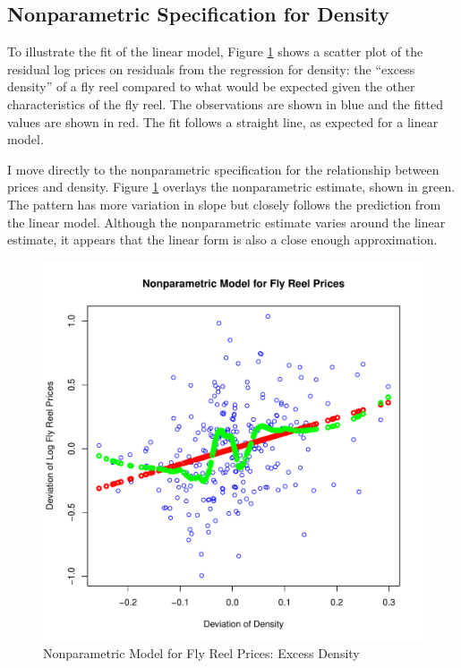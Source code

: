 \clearpage
\subsection{Nonparametric Specification for Density}

To illustrate the fit of the linear model, 
Figure \ref{fig:dev_np_vs_density_dev} 
shows a scatter plot 
of the residual log prices on 
residuals from the regression for 
density:
the ``excess density'' of a fly reel 
compared to what would be 
expected given the other characteristics of the fly reel. 
The observations are shown in blue
and the fitted values are shown in red.
The fit follows a straight line, as expected for a linear model. 

% 
I move directly to the nonparametric specification for 
the relationship between prices and 
density.
Figure \ref{fig:dev_np_vs_density_dev} 
overlays the nonparametric estimate, shown in green. 
The pattern has more variation in slope but 
closely follows the prediction from the linear model. 
Although the nonparametric estimate varies around the linear estimate,
it appears that the linear form
is also a close enough approximation.


\begin{figure}[h!]
  \centering
  \includegraphics[scale = 0.5, keepaspectratio=true]{../Figures/dev_np_vs_density_dev}
  \caption{Nonparametric Model for Fly Reel Prices: Excess Density} \label{fig:dev_np_vs_density_dev}
\end{figure}

